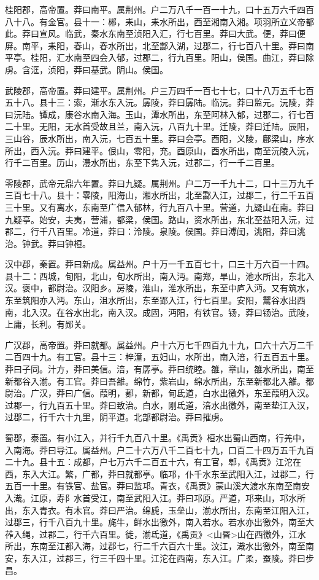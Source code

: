 \documentclass[]{article}
\begin{document}
桂阳郡，高帝置。莽曰南平。属荆州。户二万八千一百一十九，口十五万六千四百八十八。有金官。县十一：郴，耒山，耒水所出，西至湘南入湘。项羽所立义帝都此。莽曰宣风。临武，秦水东南至浈阳入汇，行七百里。莽曰大武。便，莽曰便屏。南平，耒阳，春山，舂水所出，北至酃入湖，过郡二，行七百八十里。莽曰南平亭。桂阳，汇水南至四会入郁，过郡二，行九百里。阳山，侯国。曲江，莽曰除虏。含洭，浈阳，莽曰基武。阴山。侯国。

武陵郡，高帝置。莽曰建平。属荆州。户三万四千一百七十七，口十八万五千七百五十八。县十三：索，渐水东入沅。孱陵，莽曰孱陆。临沅。莽曰监元。沅陵，莽曰沅陆。镡成，康谷水南入海。玉山，潭水所出，东至阿林入郁，过郡二，行七百二十里。无阳，无水首受故且兰，南入沅，八百九十里。迁陵，莽曰迁陆。辰阳，三山谷，辰水所出，南入沅，七百五十里。莽曰会亭。酉阳，义陵，鄜梁山，序水所出，西入沅。莽曰建平。佷山，零阳，充。酉原山，酉水所出，南至沅陵入沅，行千二百里。历山，澧水所出，东至下隽入沅，过郡二，行一千二百里。

零陵郡，武帝元鼎六年置。莽曰九疑。属荆州。户二万一千九十二，口十三万九千三百七十八。县十：零陵，阳海山，湘水所出，北至酃入江，过郡二，行二千五百三十里。又有离水，东南至广信入郁林，行九百八十里。营道，九疑山在南。莽曰九疑亭。始安，夫夷，营浦，都梁，侯国。路山，资水所出，东北至益阳入沅，过郡二，行千八百里。冷道，莽曰：泠陵。泉陵。侯国。莽曰溥闰，洮阳，莽曰洮治。钟武。莽曰钟桓。

汉中郡，秦置。莽曰新成。属益州。户十万一千五百七十，口三十万六百一十四。县十二：西城，旬阳，北山，旬水所出，南入沔。南郑，旱山，池水所出，东北入汉。褒中，都尉治。汉阳乡。房陵，淮山，淮水所出，东至中庐入沔。又有筑水，东至筑阳亦入沔。东山，沮水所出，东至郢入江，行七百里。安阳，鬵谷水出西南，北入汉。在谷水出北，南入汉。成固，沔阳，有铁官。钖，莽曰钖治。武陵，上庸，长利。有郧关。

广汉郡，高帝置。莽曰就都。属益州。户十六万七千四百九十九，口六十六万二千二百四十九。有工官。县十三：梓潼，五妇山，水所出，南入涪，行五百五十里。莽曰子同。汁方，莽曰美信。涪，有孱亭。莽曰统睦。雒，章山，雒水所出，南至新都谷入湔。有工官。莽曰吾雒。绵竹，紫岩山，绵水所出，东至新都北入雒。都尉治。广汉，莽曰广信。葭明，郪，新都，甸氐道，白水出徼外，东至葭明入汉。过郡一，行九百五十里。莽曰致治。白水，刚氐道，涪水出徼外，南至垫江入汉，过郡二，行千六十九里，阴平道。北部都尉治。莽曰摧虏。

蜀郡，泰置。有小江入，并行千九百八十里。《禹贡》桓水出蜀山西南，行羌中，入南海。莽曰导江。属益州。户二十六万八千二百七十九，口百二十四万五千九百二十九。县十五：成都，户七万六千二百五十六，有工官，郫，《禹贡》江沱在西，东入大江。繁，广都，莽曰就都亭。临邛，仆千水东至武阳入江，过郡二，行五百一十里。有铁官、盐官。莽曰监邛。青衣，《禹贡》蒙山溪大渡水东南至南安入渽。江原，寿阝水首受江，南至武阳入江。莽曰邛原。严道，邛来山，邛水所出，东入青衣。有木官。莽曰严治。绵虒，玉垒山，湔水所出，东南至江阳入江，过郡三，行千八百九十里。旄牛，鲜水出徼外，南入若水。若水亦出徼外，南至大莋入绳，过郡二，行千六百里。徙，湔氐道，《禹贡》\textless{}山昬\textgreater{}山在西徼外，江水所出，东南至江都入海，过郡七，行二千六百六十里。汶江，渽水出徼外，南至南安，东入江，过郡三，行三千四十里。江沱在西南，东入江。广柔，蚕陵。莽曰步昌。
\end{document}
